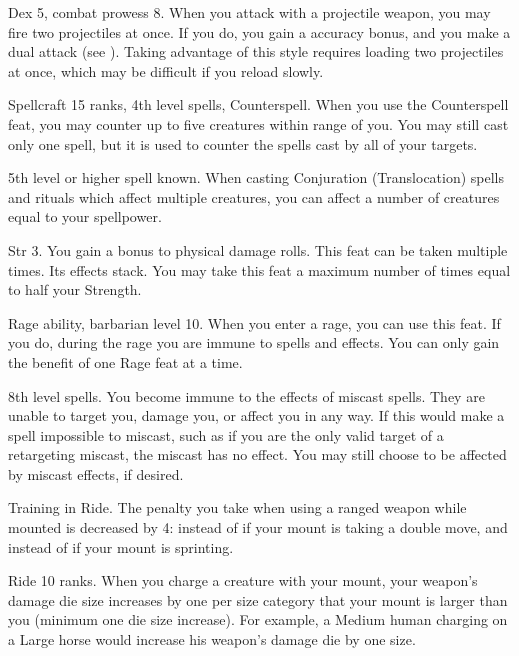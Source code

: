 \featpres Dex 5, combat prowess 8.
\featben When you attack with a projectile weapon, you may fire two projectiles at once.
If you do, you gain a  accuracy bonus, and you make a dual attack (see ).
Taking advantage of this style requires loading two projectiles at once, which may be difficult if you reload slowly.

\featpres Spellcraft 15 ranks, 4th level spells, Counterspell.
\featben When you use the Counterspell feat, you may counter up to five creatures within \rngmed range of you.
You may still cast only one spell, but it is used to counter the spells cast by all of your targets.

\featpre 5th level or higher  spell known.
\featben When casting Conjuration (Translocation) spells and rituals which affect multiple creatures, you can affect a number of creatures equal to your spellpower.

\featpres Str 3.
\featben You gain a  bonus to physical damage rolls.
 This feat can be taken multiple times. Its effects stack.
You may take this feat a maximum number of times equal to half your Strength.

\featpre Rage ability, barbarian level 10.
\featben When you enter a rage, you can use this feat. If you do, during the rage you are immune to  spells and effects.
 You can only gain the benefit of one Rage feat at a time.

\featpre 8th level spells.
\featben You become immune to the effects of miscast spells.
They are unable to target you, damage you, or affect you in any way.
If this would make a spell impossible to miscast, such as if you are the only valid target of a retargeting miscast, the miscast has no effect.
You may still choose to be affected by miscast effects, if desired.

\featpre Training in Ride.
\featben The penalty you take when using a ranged weapon while mounted is decreased by 4:  instead of  if your mount is taking a double move, and  instead of  if your mount is sprinting.

\featpre Ride 10 ranks.
\featben When you charge a creature with your mount, your weapon's damage die size increases by one per size category that your mount is larger than you (minimum one die size increase).
For example, a Medium human charging on a Large horse would increase his weapon's damage die by one size.

